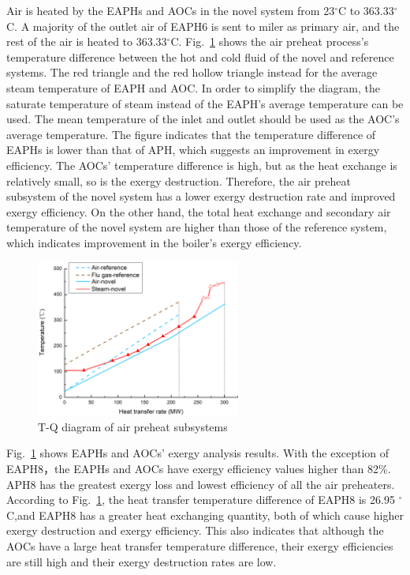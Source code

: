 \documentclass[preprint,12pt]{elsarticle}
\begin{document}
Air is heated by the EAPHs and AOCs in the novel system from 23$^\circ$C to 363.33$^\circ$C. 
A majority of the outlet air of EAPH6 is sent to miler as primary air, and the rest of the air is heated to 363.33$^\circ$C. %
Fig.~\ref{fig:APH_temper_compare} shows the air preheat process's temperature difference between the hot and cold fluid of the novel and reference systems.
The red triangle and the red hollow triangle instead for the average steam temperature of EAPH and AOC.
In order to simplify the diagram, the saturate temperature of steam instead of the EAPH's average temperature can be used. The mean temperature of the inlet and outlet should be used as the AOC's average temperature.
The figure indicates that the temperature difference of EAPHs is lower than that of APH, which suggests an improvement in exergy efficiency.
The AOCs' temperature difference is high, but as the heat exchange is relatively small, so is the exergy destruction. 
Therefore, the air preheat subsystem of the novel system has a lower exergy destruction rate and improved exergy efficiency.
On the other hand, the total heat exchange and secondary air temperature of the novel system are higher than those of the reference system, which indicates improvement in the boiler's exergy efficiency.

\begin{figure}[htbp]
\centering
\includegraphics[width=0.6\textwidth]{fig/APH_temper_compare.png}
\caption{T-Q diagram of air preheat subsystems} 
\label{fig:APH_temper_compare}
\end{figure}


Fig.~\ref{fig:APH_temper_compare} shows EAPHs and AOCs' exergy analysis results. 
With the exception of EAPH8，the EAPHs and AOCs have exergy efficiency values higher than 82\%. APH8 has the greatest exergy loss and lowest efficiency of all the air preheaters. 
According to Fig.~\ref{fig:APH_temper_compare}, the heat transfer temperature difference of EAPH8 is 26.95 $^\circ$C,and EAPH8 has a greater heat exchanging quantity, both of which cause higher exergy destruction and exergy efficiency.
This also indicates that although the AOCs have a large heat transfer temperature difference, their exergy efficiencies are still high and their exergy destruction rates are low.
\end{document}
